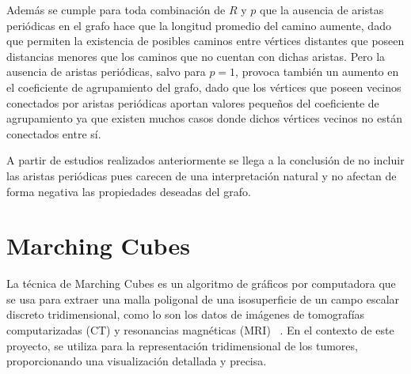 Adem\'as se cumple para toda combinaci\'on de $R$ y $p$ que la ausencia de aristas peri\'odicas en el grafo hace que la longitud promedio del camino aumente, dado que permiten la existencia de posibles caminos entre v\'ertices distantes que poseen distancias menores que los caminos que no cuentan con dichas aristas. Pero la ausencia de aristas peri\'odicas, salvo para $p=1$, provoca tambi\'en un aumento en el coeficiente de agrupamiento del grafo, dado que los v\'ertices que poseen vecinos conectados por aristas peri\'odicas aportan valores peque\~nos del coeficiente de agrupamiento ya que existen muchos casos donde dichos v\'ertices vecinos no est\'an conectados entre s\'i.

A partir de estudios realizados anteriormente \cite{viabarre2019} se llega a la conclusión de no incluir las aristas periódicas pues carecen de una interpretación natural y no afectan de forma negativa las propiedades deseadas del grafo. %

\section{Marching Cubes}

La técnica de Marching Cubes es un algoritmo de gráficos por computadora que se usa para extraer una malla poligonal de una isosuperficie de un campo escalar discreto tridimensional, como lo son los datos de imágenes de tomografías computarizadas (CT) y resonancias magnéticas (MRI) ~\cite{lorensen1987}. En el contexto de este proyecto, se utiliza para la representación tridimensional de los tumores, proporcionando una visualización detallada y precisa.

